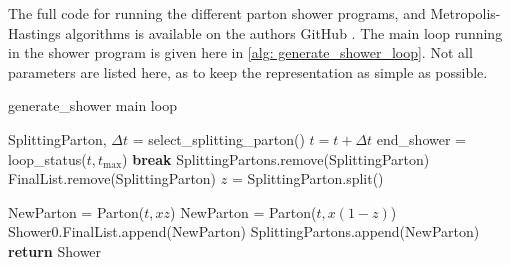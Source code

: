 \documentclass[main.tex]{subfiles}
\begin{document}
The full code for running the different parton shower programs, and Metropolis-Hastings algorithms is available on the authors GitHub \cite{GitHub_thesis}. The main loop running in the shower program is given here in \autoref{alg: generate_shower_loop}. Not all parameters are listed here, as to keep the representation as simple as possible.
\begin{center}
\begin{minipage}{.8\linewidth}
\begin{algorithm}[H]
\caption{generate\_shower main loop}
\label{alg: generate_shower_loop}
\begin{algorithmic}[1]
    \State SplittingParton, \(\Delta t\) = select\_splitting\_parton()
    \State \(t = t + \Delta t\)
    \State end\_shower = loop\_status(\(t, t_{\text{max}}\)) 
        \State \textbf{break}
        \EndIf
    \State SplittingPartons.remove(SplittingParton)
    \State FinalList.remove(SplittingParton)
    \State $z$ = SplittingParton.split()
    
            \State NewParton = Parton(\(t, xz\))
            \State NewParton = Parton(\(t, x (1-z)\))
            \EndIf
            \EndFor
    \State Shower0.FinalList.append(NewParton)
        \State SplittingPartons.append(NewParton)
        \EndIf
    \EndWhile
    \State \textbf{return} Shower
\end{algorithmic}
\end{algorithm}
\end{minipage}
\end{center}
\end{document}

